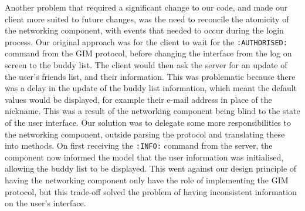Another problem that required a significant change to our code, and made our client more suited to future changes, was the need to reconcile the atomicity of the networking component, with events that needed to occur during the login process. Our original approach was for the client to wait for the \texttt{:AUTHORISED:} command from the GIM protocol, before changing the interface from the log on screen to the buddy list. The client would then ask the server for an update of the user's friends list, and their information. This was problematic because there was a delay in the update of the buddy list information, which meant the default values would be displayed, for example their e-mail address in place of the nickname. This was a result of the networking component being blind to the state of the user interface. Our solution was to delegate some more responsibilities to the networking  component, outside parsing the protocol and translating these into methods. On first receiving the \texttt{:INFO:} command from the server, the component now informed the model that the user information was initialised, allowing the buddy list to be displayed. This went against our design principle of having the networking component only have the role of implementing the GIM protocol, but this trade-off solved the problem of having inconsistent information on the user's interface. 
